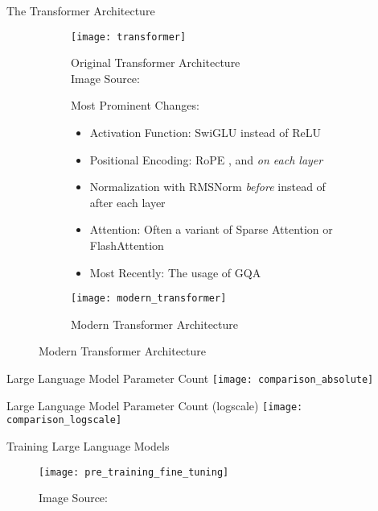 \begin{frame}[c]{The Transformer Architecture}
    \begin{figure}
        \captionsetup[subfigure]{labelformat=empty}
        \begin{subfigure}{0.3\textwidth}
            \centering
            \texttt{[image: transformer]}
            \caption{
                Original Transformer Architecture \\
            Image Source: \cite{vaswani_attention_2017}
            } 
        \end{subfigure}%
        \begin{subfigure}{0.45\textwidth}
            Most Prominent Changes:
            \begin{itemize}[<+(1)->]
                \item Activation Function: \gls{SwiGLU} \cite{shazeer_glu_2020} instead of \gls{ReLU}
                \item Positional Encoding: \gls{RoPE} \cite{su_roformer_2022}, and \textit{on each layer}
                \item Normalization with RMSNorm \cite{ba_layer_2016} \textit{before} instead of after each layer
                \item Attention: Often a variant of Sparse Attention \cite{child_generating_2019} or FlashAttention \cite{dao_flashattention_2022}
                \item Most Recently: The usage of \acrfull{GQA} \cite{ainslie_gqa_2023}
            \end{itemize}
            \vspace{1em}
        \end{subfigure}%
        \hspace{1em}
        \begin{subfigure}{0.2\textwidth}
            \centering
            \texttt{[image: modern\_transformer]}
            \caption{
                Modern Transformer Architecture
            }
        \end{subfigure}
    \end{figure} 
\end{frame}


\begin{frame}[c]{Large Language Model Parameter Count}
    \centering
    \texttt{[image: comparison\_absolute]}
\end{frame}

\begin{frame}[c]{Large Language Model Parameter Count (logscale)}
    \centering
    \texttt{[image: comparison\_logscale]}
\end{frame}


\begin{frame}[c]{Training Large Language Models}
    \begin{figure}
        \texttt{[image: pre\_training\_fine\_tuning]}
        \caption{
            Image Source: \cite{ghosh_empowering_2023}
        }
    \end{figure}
\end{frame}
